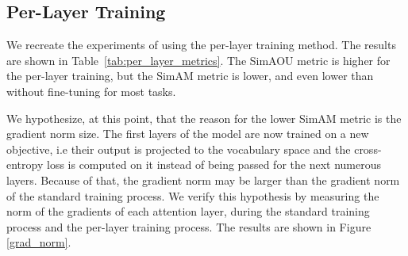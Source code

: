 \documentclass[11pt]{article}
\begin{document}
\begin{table}[t]
	\centering
	\quad
	\caption{SimAOU and SimAM on all 6 datasets, comparing similarity between baseline metrics, standard finetuning and per-layer fine-tuning.}
	\label{tab:per_layer_metrics}
\end{table}

\subsection{Per-Layer Training}
We recreate the experiments of \cite{dai2023gpt} using the per-layer training method.
The results are shown in Table~\ref{tab:per_layer_metrics}.
The SimAOU metric is higher for the per-layer training, but the SimAM metric is lower, and even lower than without fine-tuning for most tasks.

We hypothesize, at this point, that the reason for the lower SimAM metric is the gradient norm size.
The first layers of the model are now trained on a new objective, i.e their output is projected to the vocabulary space and the cross-entropy loss is computed on it instead of being passed for the next numerous layers.
Because of that, the gradient norm may be larger than the gradient norm of the standard training process.
We verify this hypothesis by measuring the norm of the gradients of each attention layer, during the standard training process and the per-layer training process.
The results are shown in Figure \ref{grad_norm}.
\end{document}
